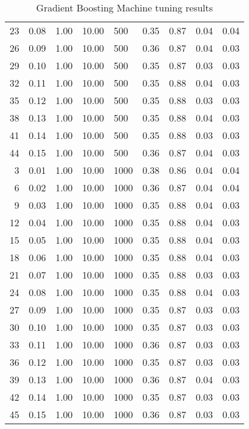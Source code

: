 \begin{table}[ht]
\begin{tabular}{rrrrlrrrr}
  23 & 0.08 & 1.00 & 10.00 & 500 & 0.35 & 0.87 & 0.04 & 0.04 \\ 
  26 & 0.09 & 1.00 & 10.00 & 500 & 0.36 & 0.87 & 0.04 & 0.03 \\ 
  29 & 0.10 & 1.00 & 10.00 & 500 & 0.35 & 0.87 & 0.03 & 0.03 \\ 
  32 & 0.11 & 1.00 & 10.00 & 500 & 0.35 & 0.88 & 0.04 & 0.03 \\ 
  35 & 0.12 & 1.00 & 10.00 & 500 & 0.35 & 0.88 & 0.03 & 0.03 \\ 
  38 & 0.13 & 1.00 & 10.00 & 500 & 0.35 & 0.88 & 0.04 & 0.03 \\ 
  41 & 0.14 & 1.00 & 10.00 & 500 & 0.35 & 0.88 & 0.03 & 0.03 \\ 
  44 & 0.15 & 1.00 & 10.00 & 500 & 0.36 & 0.87 & 0.04 & 0.03 \\ 
  3 & 0.01 & 1.00 & 10.00 & 1000 & 0.38 & 0.86 & 0.04 & 0.04 \\ 
  6 & 0.02 & 1.00 & 10.00 & 1000 & 0.36 & 0.87 & 0.04 & 0.04 \\ 
  9 & 0.03 & 1.00 & 10.00 & 1000 & 0.35 & 0.88 & 0.04 & 0.03 \\ 
  12 & 0.04 & 1.00 & 10.00 & 1000 & 0.35 & 0.88 & 0.04 & 0.03 \\ 
  15 & 0.05 & 1.00 & 10.00 & 1000 & 0.35 & 0.88 & 0.04 & 0.03 \\ 
  18 & 0.06 & 1.00 & 10.00 & 1000 & 0.35 & 0.88 & 0.04 & 0.03 \\ 
  21 & 0.07 & 1.00 & 10.00 & 1000 & 0.35 & 0.88 & 0.03 & 0.03 \\ 
  24 & 0.08 & 1.00 & 10.00 & 1000 & 0.35 & 0.88 & 0.04 & 0.03 \\ 
  27 & 0.09 & 1.00 & 10.00 & 1000 & 0.35 & 0.87 & 0.03 & 0.03 \\ 
  30 & 0.10 & 1.00 & 10.00 & 1000 & 0.35 & 0.87 & 0.03 & 0.03 \\ 
  33 & 0.11 & 1.00 & 10.00 & 1000 & 0.36 & 0.87 & 0.03 & 0.03 \\ 
  36 & 0.12 & 1.00 & 10.00 & 1000 & 0.35 & 0.87 & 0.03 & 0.03 \\ 
  39 & 0.13 & 1.00 & 10.00 & 1000 & 0.36 & 0.87 & 0.04 & 0.03 \\ 
  42 & 0.14 & 1.00 & 10.00 & 1000 & 0.35 & 0.87 & 0.03 & 0.03 \\ 
  45 & 0.15 & 1.00 & 10.00 & 1000 & 0.36 & 0.87 & 0.03 & 0.03 \\ 
   \hline
\end{tabular}
\caption{Gradient Boosting Machine tuning results} 
\label{tab:gmbresults}
\end{table}
